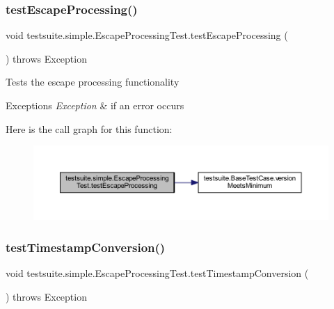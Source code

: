 \subsubsection{\texorpdfstring{test\+Escape\+Processing()}{testEscapeProcessing()}}
{\footnotesize\ttfamily void testsuite.\+simple.\+Escape\+Processing\+Test.\+test\+Escape\+Processing (\begin{DoxyParamCaption}{ }\end{DoxyParamCaption}) throws Exception}

Tests the escape processing functionality


\begin{DoxyExceptions}{Exceptions}
{\em Exception} & if an error occurs \\
\hline
\end{DoxyExceptions}
Here is the call graph for this function\+:
\nopagebreak
\begin{figure}[H]
\begin{center}
\leavevmode
\includegraphics[width=350pt]{classtestsuite_1_1simple_1_1_escape_processing_test_a89dd9212c87f06506d7442cafd9ce935_cgraph}
\end{center}
\end{figure}
\mbox{\label{classtestsuite_1_1simple_1_1_escape_processing_test_aaf3f62a0f5fc6b6d808edba7f20361c3}} 
\subsubsection{\texorpdfstring{test\+Timestamp\+Conversion()}{testTimestampConversion()}}
{\footnotesize\ttfamily void testsuite.\+simple.\+Escape\+Processing\+Test.\+test\+Timestamp\+Conversion (\begin{DoxyParamCaption}{ }\end{DoxyParamCaption}) throws Exception}

